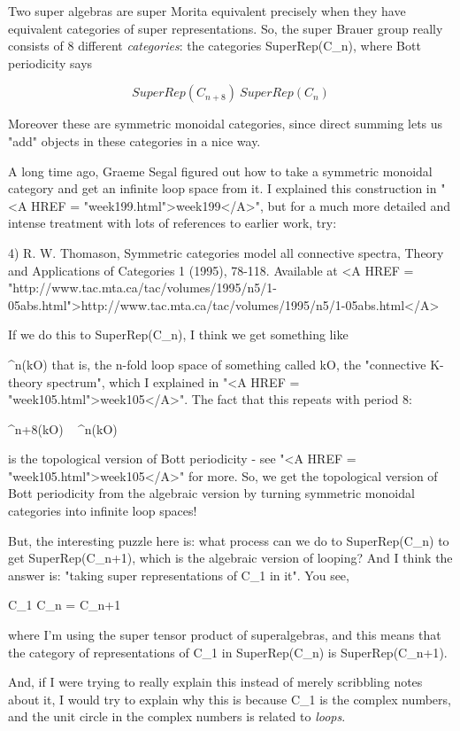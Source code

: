 Two super algebras are super Morita equivalent precisely when
they have equivalent categories of super representations.  So,
the super Brauer group really consists of 8 different \emph{categories}:
the categories SuperRep(C_{n}), where Bott periodicity says


$$

SuperRep(C_{n+8}) ~ SuperRep(C_{n})
$$
    
Moreover these are symmetric monoidal categories, since direct 
summing lets us "add" objects in these categories in a nice way.

A long time ago, Graeme Segal figured out how to take a symmetric
monoidal category and get an infinite loop space from it.
I explained this construction in "<A HREF = "week199.html">week199</A>", but for a much more
detailed and intense treatment with lots of references to earlier 
work, try:

4) R. W. Thomason, Symmetric categories model all connective 
spectra, Theory and Applications of Categories 1 (1995), 78-118.
Available at <A HREF = "http://www.tac.mta.ca/tac/volumes/1995/n5/1-05abs.html">http://www.tac.mta.ca/tac/volumes/1995/n5/1-05abs.html</A>
  
If we do this to SuperRep(C_{n}), I think we get something like 

\Omega ^{n}(kO)
that is, the n-fold loop space of something called kO, the "connective
K-theory spectrum", which I explained in "<A HREF = "week105.html">week105</A>".  The fact that this 
repeats with period 8:

\Omega ^{n+8}(kO) ~ \Omega ^{n}(kO)

is the topological version of Bott periodicity - see "<A HREF = "week105.html">week105</A>" for more.
So, we get the topological version of Bott periodicity from the algebraic
version by turning symmetric monoidal categories into infinite loop 
spaces!  

But, the interesting puzzle here is: what process can we do to 
SuperRep(C_{n})
to get SuperRep(C_{n+1}), which is the algebraic version of looping?
And I think the answer 
is: "taking super representations of C_{1} in it".
You see, 

C_{1} \otimes  C_{n} = C_{n+1}

where I'm using the super tensor product of superalgebras, and this
means that the category of representations of C_{1} 
in SuperRep(C_{n}) 
is SuperRep(C_{n+1}).  

And, if I were trying to really explain this instead of merely scribbling
notes about it, I would try to explain why this is because C_{1} 
is the complex
numbers, and the unit circle in the complex numbers is related to 
\emph{loops}.

